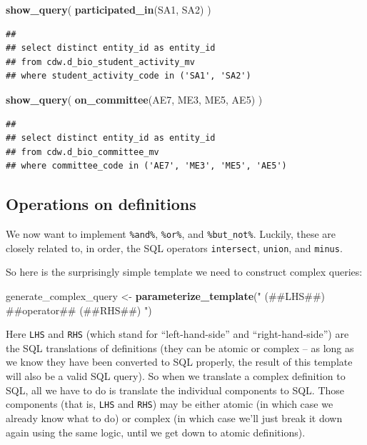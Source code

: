\documentclass[]{book}
\newenvironment{Shaded}{\begin{snugshade}}{\end{snugshade}}
\newcommand{\KeywordTok}[1]{\textcolor[rgb]{0.13,0.29,0.53}{\textbf{#1}}}
\newcommand{\NormalTok}[1]{#1}
\newcommand{\StringTok}[1]{\textcolor[rgb]{0.31,0.60,0.02}{#1}}
\begin{document}
\begin{Shaded}
\begin{Highlighting}[]
\KeywordTok{show_query}\NormalTok{( }\KeywordTok{participated_in}\NormalTok{(SA1, SA2) )}
\end{Highlighting}
\end{Shaded}

\begin{verbatim}
## 
## select distinct entity_id as entity_id
## from cdw.d_bio_student_activity_mv
## where student_activity_code in ('SA1', 'SA2')
\end{verbatim}

\begin{Shaded}
\begin{Highlighting}[]
\KeywordTok{show_query}\NormalTok{( }\KeywordTok{on_committee}\NormalTok{(AE7, ME3, ME5, AE5) )}
\end{Highlighting}
\end{Shaded}

\begin{verbatim}
## 
## select distinct entity_id as entity_id
## from cdw.d_bio_committee_mv
## where committee_code in ('AE7', 'ME3', 'ME5', 'AE5')
\end{verbatim}

\hypertarget{operations-on-definitions}{%
\subsection{Operations on definitions}\label{operations-on-definitions}}

We now want to implement \texttt{\%and\%}, \texttt{\%or\%}, and \texttt{\%but\_not\%}. Luckily, these are closely related to, in order, the SQL operators \texttt{intersect}, \texttt{union}, and \texttt{minus}.

So here is the surprisingly simple template we need to construct complex queries:

\begin{Shaded}
\begin{Highlighting}[]
\NormalTok{generate_complex_query <-}\StringTok{ }\KeywordTok{parameterize_template}\NormalTok{(}\StringTok{"}
\StringTok{(##LHS##)}
\StringTok{##operator##}
\StringTok{(##RHS##)}
\StringTok{"}\NormalTok{)}
\end{Highlighting}
\end{Shaded}

Here \texttt{LHS} and \texttt{RHS} (which stand for ``left-hand-side'' and ``right-hand-side'') are the SQL translations of definitions (they can be atomic or complex -- as long as we know they have been converted to SQL properly, the result of this template will also be a valid SQL query). So when we translate a complex definition to SQL, all we have to do is translate the individual components to SQL. Those components (that is, \texttt{LHS} and \texttt{RHS}) may be either atomic (in which case we already know what to do) or complex (in which case we'll just break it down again using the same logic, until we get down to atomic definitions).
\end{document}
